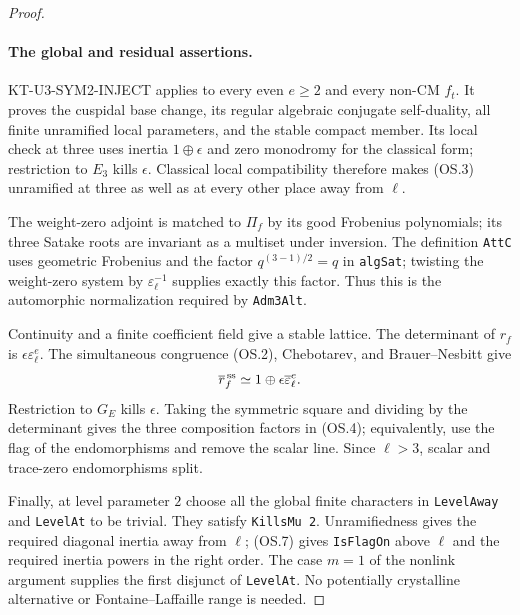 \begin{proof}
\paragraph{The global and residual assertions.}
KT-U3-SYM2-INJECT applies to every even $e\geq2$ and every
non-CM $f_t$. It proves the cuspidal base change, its regular
algebraic conjugate self-duality, all finite unramified local
parameters, and the stable compact member. Its local check
at three uses inertia $1\oplus\epsilon$ and zero monodromy
for the classical form; restriction to $E_3$ kills
$\epsilon$. Classical local compatibility therefore makes
(OS.3) unramified at three as well as at every other place
away from $\ell$.

The weight-zero adjoint is matched to $\Pi_f$ by its good
Frobenius polynomials; its three Satake roots are invariant
as a multiset under inversion. The definition \texttt{AttC} uses
geometric Frobenius and the factor $q^{(3-1)/2}=q$ in
\texttt{algSat}; twisting the weight-zero system by
$\varepsilon_\ell^{-1}$ supplies exactly this factor.
Thus this is the automorphic normalization required by
\texttt{Adm3Alt}.

Continuity and a finite coefficient field give a stable
lattice. The determinant of $r_f$ is
$\epsilon\varepsilon_\ell^e$. The simultaneous congruence
(OS.2), Chebotarev, and Brauer--Nesbitt give
\[
       \overline r_f^{\,\rm ss}
              \simeq1\oplus\epsilon\overline\varepsilon_\ell^e.
\]
Restriction to $G_E$ kills $\epsilon$. Taking the symmetric
square and dividing by the determinant gives the three
composition factors in (OS.4); equivalently, use the flag
of the endomorphisms and remove the scalar line. Since
$\ell>3$, scalar and trace-zero endomorphisms split.

Finally, at level parameter $2$ choose all the global finite
characters in \texttt{LevelAway} and \texttt{LevelAt} to be
trivial. They satisfy \texttt{KillsMu 2}. Unramifiedness
gives the required diagonal inertia away from $\ell$;
(OS.7) gives \texttt{IsFlagOn} above $\ell$ and the required
inertia powers in the right order. The case $m=1$ of the
nonlink argument supplies the first disjunct of
\texttt{LevelAt}. No potentially crystalline alternative or
Fontaine--Laffaille range is needed.
\end{proof}

